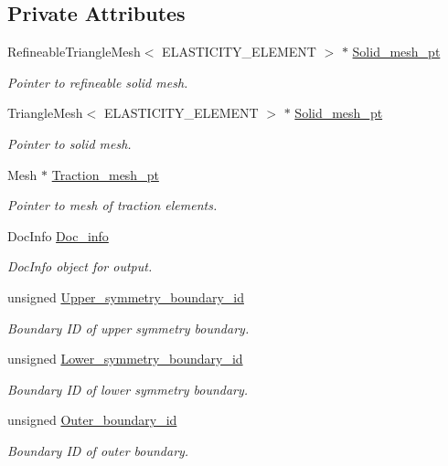 \subsection*{Private Attributes}
\begin{DoxyCompactItemize}
\item 
Refineable\+Triangle\+Mesh$<$ E\+L\+A\+S\+T\+I\+C\+I\+T\+Y\+\_\+\+E\+L\+E\+M\+E\+NT $>$ $\ast$ \hyperlink{classRingWithTRibProblem_a89da884cecc2d8984168817de7b1927e}{Solid\+\_\+mesh\+\_\+pt}
\begin{DoxyCompactList}\small\item\em Pointer to refineable solid mesh. \end{DoxyCompactList}\item 
Triangle\+Mesh$<$ E\+L\+A\+S\+T\+I\+C\+I\+T\+Y\+\_\+\+E\+L\+E\+M\+E\+NT $>$ $\ast$ \hyperlink{classRingWithTRibProblem_ac9502dc1955f4d3d40adb5ca581aacb6}{Solid\+\_\+mesh\+\_\+pt}
\begin{DoxyCompactList}\small\item\em Pointer to solid mesh. \end{DoxyCompactList}\item 
Mesh $\ast$ \hyperlink{classRingWithTRibProblem_abf11b5c5d0c63c91ca7b248c18acad5b}{Traction\+\_\+mesh\+\_\+pt}
\begin{DoxyCompactList}\small\item\em Pointer to mesh of traction elements. \end{DoxyCompactList}\item 
Doc\+Info \hyperlink{classRingWithTRibProblem_a086bb927e3091b5d38e193b2ccb84e3b}{Doc\+\_\+info}
\begin{DoxyCompactList}\small\item\em Doc\+Info object for output. \end{DoxyCompactList}\item 
unsigned \hyperlink{classRingWithTRibProblem_ad15da3f1436b47c6cd7a79962aaa895d}{Upper\+\_\+symmetry\+\_\+boundary\+\_\+id}
\begin{DoxyCompactList}\small\item\em Boundary ID of upper symmetry boundary. \end{DoxyCompactList}\item 
unsigned \hyperlink{classRingWithTRibProblem_a93f5abb451b85f65316b930802c727f8}{Lower\+\_\+symmetry\+\_\+boundary\+\_\+id}
\begin{DoxyCompactList}\small\item\em Boundary ID of lower symmetry boundary. \end{DoxyCompactList}\item 
unsigned \hyperlink{classRingWithTRibProblem_a88918269cac403640e2659d48210d03c}{Outer\+\_\+boundary\+\_\+id}
\begin{DoxyCompactList}\small\item\em Boundary ID of outer boundary. \end{DoxyCompactList}\end{DoxyCompactItemize}


